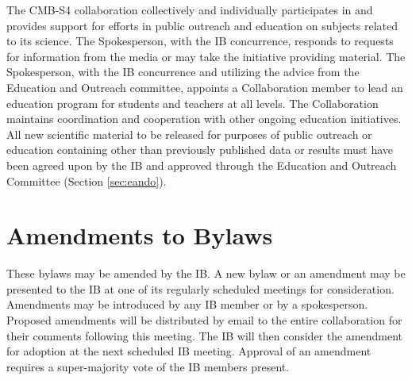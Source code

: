 \documentclass[12pt]{article}
\begin{document}
The CMB-S4 collaboration collectively and individually participates in and provides support for efforts in public outreach and education on subjects related to its science. The Spokesperson, with the IB concurrence, responds to requests for information from the media or may take the initiative providing material. The Spokesperson, with the IB concurrence and utilizing the advice from the Education and Outreach committee, appoints a Collaboration member to lead an education program for students and teachers at all levels. The Collaboration maintains coordination and cooperation with other ongoing education initiatives. All new scientific material to be released for purposes of public outreach or education containing other than previously published data or results must have been agreed upon by the IB and approved through the Education and Outreach Committee (Section \ref{sec:eando}).



\section{Amendments to Bylaws}
\label{sec:amend}

These bylaws may be amended by the IB. A new bylaw or an amendment may be presented to the IB at one of its regularly scheduled meetings for consideration. Amendments may be introduced by any IB member or by a spokesperson. Proposed amendments will be distributed by email to the entire collaboration for their comments following this meeting. The IB will then consider the amendment for adoption at the next scheduled IB meeting. Approval of an amendment requires a super-majority vote of the IB members present.
\end{document}
